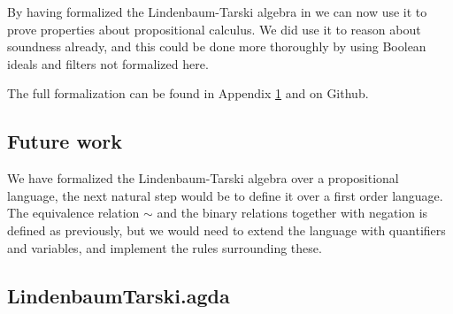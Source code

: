 \documentclass[titlepage]{article}
\begin{document}
By having formalized the Lindenbaum-Tarski algebra in \CubicalAgda we can now use it to prove properties about propositional calculus. We did use it to reason about soundness already, and this could be done more thoroughly by using Boolean ideals and filters not formalized here\cite{Tressl:2022}\cite{Tay:2012}.

The full formalization can be found in Appendix \ref{code} and on Github\cite{LTgit}.


\subsection{Future work}
We have formalized the Lindenbaum-Tarski algebra over a propositional language, the next natural step would be to define it over a first order language. The equivalence relation $\sim$ and the binary relations together with negation is defined as previously, but we would need to extend the language with quantifiers and variables, and implement the rules surrounding these.











\newpage


\newpage
\begin{appendices}
    \section{LindenbaumTarski.agda}\label{code}
\end{appendices}
\end{document}
